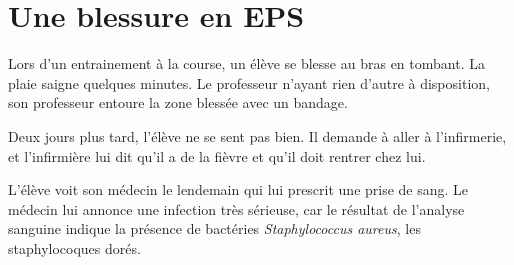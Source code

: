 \documentclass{Controle}
\begin{document}
\nom

\section*{Une blessure en EPS}

Lors d'un entrainement à la course, un élève se blesse au bras en tombant. La plaie saigne quelques minutes. Le professeur n'ayant rien d'autre à disposition, son professeur entoure la zone blessée avec un bandage.

Deux jours plus tard, l'élève ne se sent pas bien. Il demande à aller à l'infirmerie, et l'infirmière lui dit qu'il a de la fièvre et qu'il doit rentrer chez lui.

L'élève voit son médecin le lendemain qui lui prescrit une prise de sang. Le médecin lui annonce une infection très sérieuse, car le résultat de l'analyse sanguine indique la présence de bactéries \emph{Staphylococcus aureus}, les staphylocoques dorés.




\end{document}
